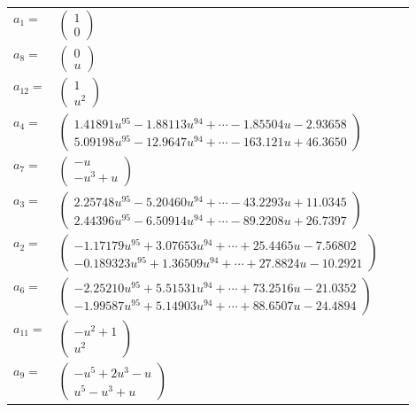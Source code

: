 \documentclass[1p]{elsarticle_modified}
\theoremstyle{definition}
\begin{document}
\begin{tabular}{m{7pt} m{180pt} m{7pt} m{180pt} }
\flushright $a_{1}=$&$\begin{pmatrix}1\\0\end{pmatrix}$ \\
\flushright $a_{8}=$&$\begin{pmatrix}0\\u\end{pmatrix}$ \\
\flushright $a_{12}=$&$\begin{pmatrix}1\\u^2\end{pmatrix}$ \\
\flushright $a_{4}=$&$\begin{pmatrix}1.41891 u^{95}-1.88113 u^{94}+\cdots-1.85504 u-2.93658\\5.09198 u^{95}-12.9647 u^{94}+\cdots-163.121 u+46.3650\end{pmatrix}$ \\
\flushright $a_{7}=$&$\begin{pmatrix}- u\\- u^3+u\end{pmatrix}$ \\
\flushright $a_{3}=$&$\begin{pmatrix}2.25748 u^{95}-5.20460 u^{94}+\cdots-43.2293 u+11.0345\\2.44396 u^{95}-6.50914 u^{94}+\cdots-89.2208 u+26.7397\end{pmatrix}$ \\
\flushright $a_{2}=$&$\begin{pmatrix}-1.17179 u^{95}+3.07653 u^{94}+\cdots+25.4465 u-7.56802\\-0.189323 u^{95}+1.36509 u^{94}+\cdots+27.8824 u-10.2921\end{pmatrix}$ \\
\flushright $a_{6}=$&$\begin{pmatrix}-2.25210 u^{95}+5.51531 u^{94}+\cdots+73.2516 u-21.0352\\-1.99587 u^{95}+5.14903 u^{94}+\cdots+88.6507 u-24.4894\end{pmatrix}$ \\
\flushright $a_{11}=$&$\begin{pmatrix}- u^2+1\\u^2\end{pmatrix}$ \\
\flushright $a_{9}=$&$\begin{pmatrix}- u^5+2 u^3- u\\u^5- u^3+u\end{pmatrix}$ \\

\end{tabular}
\end{document}
